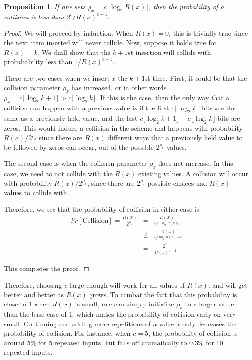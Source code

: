 \documentclass[12pt]{article}
\newtheorem{proposition}[theorem]{Proposition}
\begin{document}
\begin{proposition}
  If one sets $\rho_x = c \lfloor \log_2 R(x) \rfloor$, then the probability of a collision is less than $2^c/R(x)^{c-1}$.
\end{proposition}
\begin{proof}
  We will proceed by induction. When $R(x) = 0$, this is trivially true since the next item inserted will never collide. Now, suppose it holds true for $R(x) = k$. We shall show that the $k+1$st insertion will collide with probabability less than $1/R(x)^{c-1}$.

  There are two cases when we insert $x$ the $k+1$st time. First, it could be that the collision parameter $\rho_x$ has increased, or in other words $\rho_x = c \lfloor \log_2 k + 1 \rfloor > c \lfloor \log_2 k \rfloor$. If this is the case, then the only way that a collision can happen with a previous value is if the first $c \lfloor \log_2 k \rfloor$ bits are the same as a previously held value, and the last $c \lfloor \log_2 k + 1 \rfloor - c \lfloor \log_2 k \rfloor$ bits are zeros. This would induce a collision in the scheme and happens with probability $R(x) / 2^{\rho_x}$ since there are $R(x)$ different ways that a previously held value to be followed by zeros can occur, out of the possible $2^{\rho_x}$ values.

  The second case is when the collision parameter $\rho_x$ does not increase. In this case, we need to not collide with the $R(x)$ existing values. A collision will occur with probability $R(x) / 2^{\rho_x}$, since there are $2^{\rho_x}$ possible choices and $R(x)$ values to collide with.

  Therefore, we see that the probability of collision in either case is:
  \begin{eqnarray}
    Pr[\textrm{Collision}] = \frac{R(x)}{2^{\rho_x}} &=& \frac{R(x)}{2^{c \lfloor \log_2 R(x) \rfloor}} \\
                                                     &\leq& \frac{R(x)}{2^{c \log_2 R(x) - c}} \\
                                                     &=& \frac{2^c}{R(x)^{c-1}}
  \end{eqnarray}

  This completes the proof.
\end{proof}

Therefore, choosing $c$ large enough will work for all values of $R(x)$, and will get better and better as $R(x)$ grows. To combat the fact that this probability is close to 1 when $R(x)$ is small, one can simply initialize $\rho_x$ to a larger value than the base case of 1, which makes the probability of collision early on very small. Continuing and adding more repetitions of a value $x$ only decreases the probability of collision. For instance, when $c = 5$, the probability of collision is around 5\% for 5 repeated inputs, but falls off dramatically to 0.3\% for 10 repeated inputs.
\end{document}

